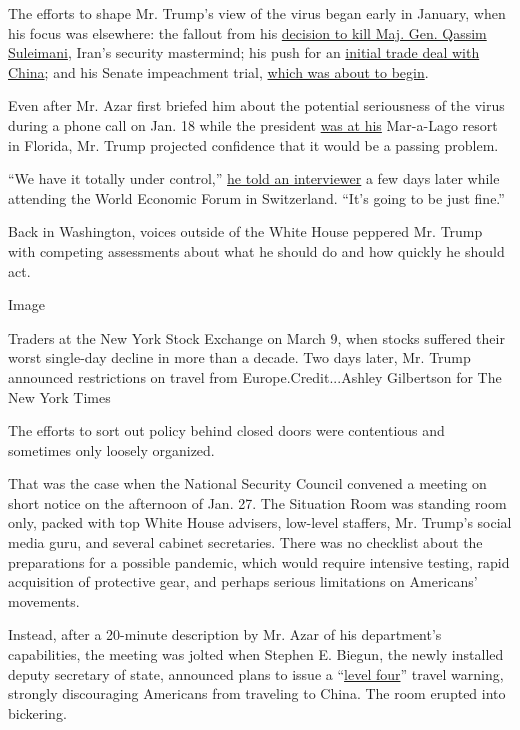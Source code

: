 The efforts to shape Mr. Trump's view of the virus began early in
January, when his focus was elsewhere: the fallout from his
\href{https://www.nytimes.com/2020/01/03/world/middleeast/iranian-general-qassem-soleimani-killed.html}{decision
to kill Maj. Gen. Qassim Suleimani}, Iran's security mastermind; his
push for an
\href{https://www.nytimes.com/2019/10/11/business/economy/us-china-trade-deal.html}{initial
trade deal with China}; and his Senate impeachment trial,
\href{https://www.nytimes.com/2020/01/21/us/politics/trump.html}{which
was about to begin}.

Even after Mr. Azar first briefed him about the potential seriousness of
the virus during a phone call on Jan. 18 while the president
\href{https://www.nytimes.com/interactive/2017/04/05/us/politics/tracking-trumps-visits-to-his-branded-properties.html}{was
at his} Mar-a-Lago resort in Florida, Mr. Trump projected confidence
that it would be a passing problem.

``We have it totally under control,''
\href{https://www.cnbc.com/2020/01/22/cnbc-transcript-president-donald-trump-sits-down-with-cnbcs-joe-kernen-at-the-world-economic-forum-in-davos-switzerland.html}{he
told an interviewer} a few days later while attending the World Economic
Forum in Switzerland. ``It's going to be just fine.''

Back in Washington, voices outside of the White House peppered Mr. Trump
with competing assessments about what he should do and how quickly he
should act.

Image

Traders at the New York Stock Exchange on March 9, when stocks suffered
their worst single-day decline in more than a decade. Two days later,
Mr. Trump announced restrictions on travel from Europe.Credit...Ashley
Gilbertson for The New York Times

The efforts to sort out policy behind closed doors were contentious and
sometimes only loosely organized.

That was the case when the National Security Council convened a meeting
on short notice on the afternoon of Jan. 27. The Situation Room was
standing room only, packed with top White House advisers, low-level
staffers, Mr. Trump's social media guru, and several cabinet
secretaries. There was no checklist about the preparations for a
possible pandemic, which would require intensive testing, rapid
acquisition of protective gear, and perhaps serious limitations on
Americans' movements.

Instead, after a 20-minute description by Mr. Azar of his department's
capabilities, the meeting was jolted when Stephen E. Biegun, the newly
installed deputy secretary of state, announced plans to issue a
``\href{https://travel.state.gov/content/travel/en/traveladvisories/ea/travel-advisory-alert-global-level-4-health-advisory-issue.html}{level
four}'' travel warning, strongly discouraging Americans from traveling
to China. The room erupted into bickering.

